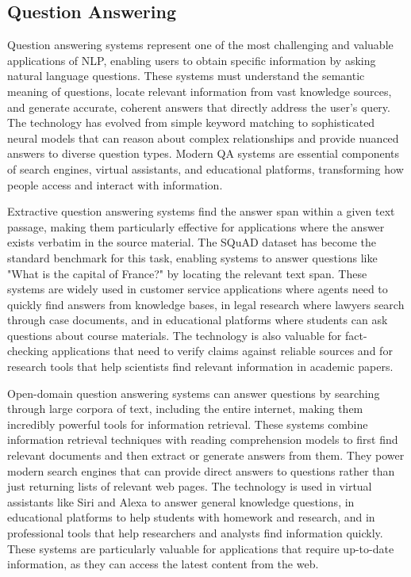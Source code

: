 \subsection{Question Answering}

Question answering systems represent one of the most challenging and valuable applications of NLP, enabling users to obtain specific information by asking natural language questions. These systems must understand the semantic meaning of questions, locate relevant information from vast knowledge sources, and generate accurate, coherent answers that directly address the user's query. The technology has evolved from simple keyword matching to sophisticated neural models that can reason about complex relationships and provide nuanced answers to diverse question types. Modern QA systems are essential components of search engines, virtual assistants, and educational platforms, transforming how people access and interact with information.

Extractive question answering systems find the answer span within a given text passage, making them particularly effective for applications where the answer exists verbatim in the source material. The SQuAD dataset has become the standard benchmark for this task, enabling systems to answer questions like "What is the capital of France?" by locating the relevant text span. These systems are widely used in customer service applications where agents need to quickly find answers from knowledge bases, in legal research where lawyers search through case documents, and in educational platforms where students can ask questions about course materials. The technology is also valuable for fact-checking applications that need to verify claims against reliable sources and for research tools that help scientists find relevant information in academic papers.

Open-domain question answering systems can answer questions by searching through large corpora of text, including the entire internet, making them incredibly powerful tools for information retrieval. These systems combine information retrieval techniques with reading comprehension models to first find relevant documents and then extract or generate answers from them. They power modern search engines that can provide direct answers to questions rather than just returning lists of relevant web pages. The technology is used in virtual assistants like Siri and Alexa to answer general knowledge questions, in educational platforms to help students with homework and research, and in professional tools that help researchers and analysts find information quickly. These systems are particularly valuable for applications that require up-to-date information, as they can access the latest content from the web.

